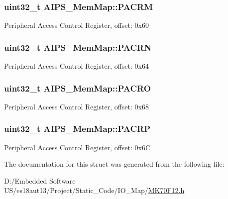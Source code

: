 \subsubsection[{P\+A\+C\+R\+M}]{\setlength{\rightskip}{0pt plus 5cm}uint32\+\_\+t A\+I\+P\+S\+\_\+\+Mem\+Map\+::\+P\+A\+C\+R\+M}\label{struct_a_i_p_s___mem_map_a30e7ebe0ffb0e9d97cbfa85d65e17cbb}
Peripheral Access Control Register, offset\+: 0x60 \hypertarget{struct_a_i_p_s___mem_map_a83bf08b950901b8f6d7ef2ceb960baa8}{}
\subsubsection[{P\+A\+C\+R\+N}]{\setlength{\rightskip}{0pt plus 5cm}uint32\+\_\+t A\+I\+P\+S\+\_\+\+Mem\+Map\+::\+P\+A\+C\+R\+N}\label{struct_a_i_p_s___mem_map_a83bf08b950901b8f6d7ef2ceb960baa8}
Peripheral Access Control Register, offset\+: 0x64 \hypertarget{struct_a_i_p_s___mem_map_a5892f2b025c43f875f1c88e3a8f6da30}{}
\subsubsection[{P\+A\+C\+R\+O}]{\setlength{\rightskip}{0pt plus 5cm}uint32\+\_\+t A\+I\+P\+S\+\_\+\+Mem\+Map\+::\+P\+A\+C\+R\+O}\label{struct_a_i_p_s___mem_map_a5892f2b025c43f875f1c88e3a8f6da30}
Peripheral Access Control Register, offset\+: 0x68 \hypertarget{struct_a_i_p_s___mem_map_af6d96671be0c664042ec003595ac405e}{}
\subsubsection[{P\+A\+C\+R\+P}]{\setlength{\rightskip}{0pt plus 5cm}uint32\+\_\+t A\+I\+P\+S\+\_\+\+Mem\+Map\+::\+P\+A\+C\+R\+P}\label{struct_a_i_p_s___mem_map_af6d96671be0c664042ec003595ac405e}
Peripheral Access Control Register, offset\+: 0x6\+C 

The documentation for this struct was generated from the following file\+:\begin{DoxyCompactItemize}
\item 
D\+:/\+Embedded Software U\+S/es18aut13/\+Project/\+Static\+\_\+\+Code/\+I\+O\+\_\+\+Map/\hyperlink{_m_k70_f12_8h}{M\+K70\+F12.\+h}\end{DoxyCompactItemize}
